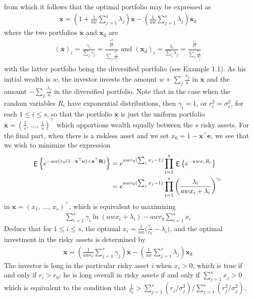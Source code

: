 \documentclass[10pt]{beamer}
\newcommand{\ds}{\displaystyle}
\DeclareMathOperator\expc{{\sf E}}
\theoremstyle{definition}
\begin{document}
\begin{frame}[allowframebreaks]
\begin{align*}
  \end{align*}
  from which it follows that the optimal portfolio may be expressed as
  \begin{align*}
    \mathbf{x} = \left(1 + \frac{1}{aw}\sum_{j=1}^s \lambda_j\right)\overline{\mathbf{x}} - \left(\frac{1}{aw}\sum_{j=1}^s \lambda_j\right)\mathbf{x}_d
  \end{align*}
  where the two portfolios $\overline{\mathbf{x}}$ and $\mathbf{x}_d$ are
  \begin{align*}
    (\overline{\mathbf{x}})_i = \frac{\gamma_i}{\sum_j\gamma_j} = \frac{\frac{r_i^2}{\sigma_i^2}}{\sum_j \frac{r_j^2}{\sigma_j^2}} \text{ and } (\mathbf{x}_d)_i = \frac{\lambda_i}{\sum_j\lambda_j} = \frac{\frac{r_i}{\sigma_i^2}}{\sum_j\frac{r_j}{\sigma_j^2}}
  \end{align*}
  with the latter portfolio being the diversified portfolio (see Example 1.1). As his initial wealth is $w$, the investor invests the amount $\ds w + \sum_j\frac{\lambda_j}{a}$ in $\overline{\mathbf{x}}$ and the amount $\ds -\sum_j\frac{\lambda_j}{a}$ in the diversified portfolio. Note that in the case when the random variables $R_i$ have exponential distributions, then $\gamma_i = 1$, or $r_i^2 = \sigma_i^2$, for each $1 \leqslant i \leqslant s$, so that the portfolio $\overline{\mathbf{x}}$ is just the uniform portfolio $\ds\overline{\mathbf{x}} = \left(\frac{1}{s},\,\ldots,\,\frac{1}{s}\right)^\top$ which apportions wealth equally between the $s$ risky assets.
  For the final part, when there is a riskless asset and we set $x_0 = 1 - \mathbf{x}^\top\mathbf{e}$, we see that we wish to minimize the expression
  \begin{align*}
    \expc\left\{e^{-aw(r_0(1-\mathbf{x}^\top\mathbf{e})+\mathbf{x}^\top\mathbf{R})}\right\} &= e^{awr_0(\sum_j x_j-1)} \prod_{i=1}^s\,\expc\big\{e^{-awx_i R_i}\big\} \\ &= e^{awr_0(\sum_j x_j-1)} \prod_{i=1}^s \left(\frac{\lambda_i}{awx_i + \lambda_i}\right)^{\gamma_i}
  \end{align*}
  in $\mathbf{x} = \left(x_1,\,\ldots,\,x_s\right)^\top$, which is equivalent to maximizing
  \begin{align*}
    \sum_{i=1}^s \gamma_i\ln(awx_i + \lambda_i) - awr_0\sum_{i=1}^s x_i
  \end{align*}
  Deduce that for $1 \leqslant i \leqslant s$, the optimal $\ds x_i = \frac{1}{aw}\Big(\frac{\gamma_i}{r_0} - \lambda_i\Big)$, and the optimal investment in the risky assets is determined by
  \begin{align*}
    \mathbf{x} = \left(\frac{1}{awr_0}\sum_{j=1}^s \gamma_j\right)\overline{\mathbf{x}} - \left(\frac{1}{aw}\sum_{j=1}^s \lambda_j\right)\mathbf{x}_d
  \end{align*}
  The investor is long in the particular risky asset $i$ when $x_i > 0$, which is true if and only if $r_i > r_0$; he is long overall in risky assets if and only if $\ds\sum_{j=1}^s x_j > 0$ which is equivalent to the condition that $\ds\frac{1}{r_0} > \sum_{j=1}^s(r_j/\sigma_j^2)/\sum_{j=1}^s(r_j^2/\sigma_j^2)$.
\end{frame}

%  
%  
\end{document}
